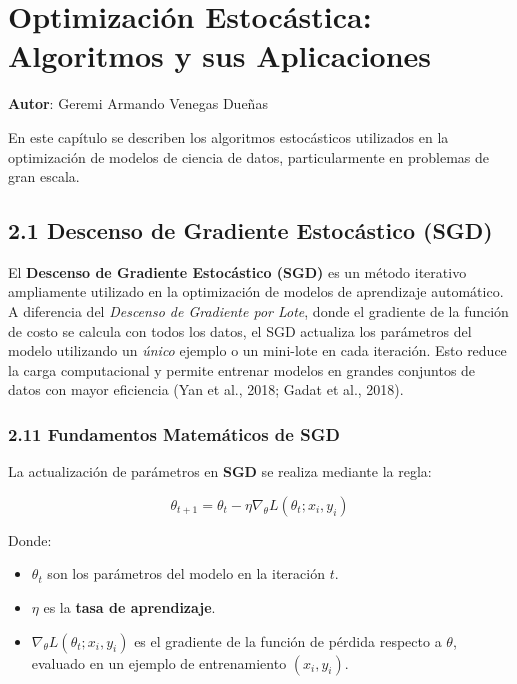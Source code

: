 \documentclass[a5paper]{article}
\begin{document}
	\chapter{Optimización Estocástica: Algoritmos y sus Aplicaciones}
	\textbf{Autor}: \large{Geremi Armando Venegas Dueñas}
	\label{chap:2}
	
	\vspace{1cm} 

	En este capítulo se describen los algoritmos estocásticos utilizados en la optimización de modelos de ciencia de datos, particularmente en problemas de gran escala.
	
	\section*{2.1 Descenso de Gradiente Estocástico (SGD)}
	
	El \textbf{Descenso de Gradiente Estoc\'astico (SGD)} es un m\'etodo iterativo ampliamente utilizado en la optimizaci\'on de modelos de aprendizaje autom\'atico. A diferencia del \textit{Descenso de Gradiente por Lote}, donde el gradiente de la funci\'on de costo se calcula con todos los datos, el SGD actualiza los par\'ametros del modelo utilizando un \textit{\'unico} ejemplo o un mini-lote en cada iteraci\'on. Esto reduce la carga computacional y permite entrenar modelos en grandes conjuntos de datos con mayor eficiencia (Yan et al., 2018; Gadat et al., 2018).
	
	\subsection*{2.11 Fundamentos Matem\'aticos de SGD}
	
	La actualizaci\'on de par\'ametros en \textbf{SGD} se realiza mediante la regla:
	
	\begin{equation}
		\theta_{t+1} = \theta_t - \eta \nabla_{\theta} L(\theta_t; x_i, y_i)
	\end{equation}
	
	Donde:
	\begin{itemize}
		\item $\theta_t$ son los par\'ametros del modelo en la iteraci\'on $t$.
		\item $\eta$ es la \textbf{tasa de aprendizaje}.
		\item $\nabla_{\theta} L(\theta_t; x_i, y_i)$ es el gradiente de la funci\'on de p\'erdida respecto a $\theta$, evaluado en un ejemplo de entrenamiento $(x_i, y_i)$.
	\end{itemize}
	
\end{document}
